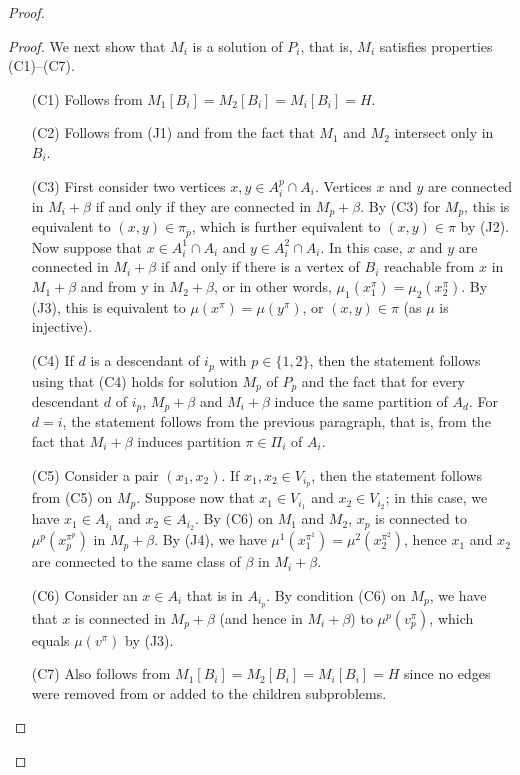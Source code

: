 \begin{proof}
\begin{proof}
We next show that \(M_i\) is a solution of \(P_i\), that is, \(M_i\) satisfies properties (C1)–(C7).

\begin{itemize}
    \item[(C1)] Follows from \(M_1[B_i] = M_2[B_i] = M_i[B_i] = H\).
    \item[(C2)] Follows from (J1) and from the fact that \(M_1\) and \(M_2\) intersect only in \(B_i\).
    \item[(C3)] First consider two vertices \(x, y \in A_i^p \cap A_i\). Vertices \(x\) and \(y\) are connected in \(M_i + \beta\) if and only if they are connected in \(M_p + \beta\). By (C3) for \(M_p\), this is equivalent to \((x, y) \in \pi_p\), which is further equivalent to \((x, y) \in \pi\) by (J2). Now suppose that \(x \in A_i^1 \cap A_i\) and \(y \in A_i^2 \cap A_i\). In this case, \(x\) and \(y\) are connected in \(M_i + \beta\) if and only if there is a vertex of \(B_i\) reachable from \(x\) in \(M_1 + \beta\) and from y in \(M_2 + \beta\), or in other words, \(\mu_1(x^\pi_1) = \mu_2(x^\pi_2)\). By (J3), this is equivalent to \(\mu(x^\pi) = \mu(y^\pi)\), or \((x, y) \in \pi\) (as \(\mu\) is injective).
    \item[(C4)] If \(d\) is a descendant of \(i_p\) with $p \in \{1,2\}$, then the statement follows using that (C4) holds for solution \(M_p\) of \(P_p\) and the fact that for every descendant \(d\) of \(i_p\), \(M_p + \beta\) and \(M_i + \beta\) induce the same partition of \(A_d\). For \(d = i\), the statement follows from the previous paragraph, that is, from the fact that \(M_i + \beta\) induces partition \(\pi \in \Pi_i\) of \(A_i\).
    \item[(C5)] Consider a pair \((x_1, x_2)\). If \(x_1, x_2 \in V_{i_p}\), then the statement follows from (C5) on \(M_p\). Suppose now that \(x_1 \in V_{i_1}\) and \(x_2 \in V_{i_2}\); in this case, we have \(x_1 \in A_{i_1}\) and \(x_2 \in A_{i_2}\). By (C6) on \(M_1\) and \(M_2\), \(x_p\) is connected to \(\mu^p(x_p^{\pi^p})\) in \(M_p + \beta\). By (J4), we have \(\mu^1(x_1^{\pi^1}) = \mu^2(x_2^{\pi^2})\), hence \(x_1\) and \(x_2\) are connected to the same class of \(\beta\) in \(M_i + \beta\).
    \item[(C6)] Consider an \(x \in A_i\) that is in \(A_{i_p}\). By condition (C6) on \(M_p\), we have that \(x\) is connected in \(M_p + \beta\) (and hence in \(M_i + \beta\)) to \(\mu^p(v^\pi_p)\), which equals \(\mu(v^\pi)\) by (J3).
    \item[(C7)] Also follows from \(M_1[B_i] = M_2[B_i] = M_i[B_i] = H\) since no edges were removed from or added to the children subproblems.
\end{itemize}


\end{proof}
\end{proof}
